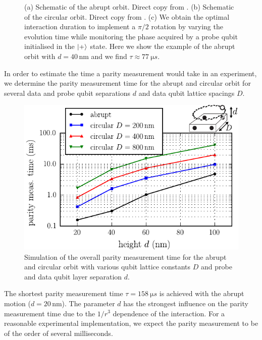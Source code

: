 \begin{figure}[H]
	\caption{(a) Schematic of the abrupt orbit. Direct copy from \cite{OGorman2016}. (b) Schematic of the circular orbit. Direct copy from \cite{OGorman2016}. (c) We obtain the optimal interaction duration to implement a $\pi/2$ rotation by varying the evolution time while monitoring the phase acquired by a probe qubit initialised in the $\ket{+}$ state. Here we show the example of the abrupt orbit with $d=40\, $nm and we find $\tau\approx \SI{77}{\micro s}$.}
	\label{FIG:abrupt_tau}
\end{figure}

In order to estimate the time a parity measurement would take in an experiment, we determine the parity measurement time for the abrupt and circular orbit for several data and probe qubit separations $d$ and data qubit lattice spacings $D$.

\begin{figure}[H]
	\includegraphics[width=\linewidth]{../Figures/tau_d_D}
	\caption{Simulation of the overall parity measurement time for the abrupt and circular orbit with various qubit lattice constants $D$ and probe and data qubit layer separation $d$.}
	\label{FIG:tau}
\end{figure}

The shortest parity measurement time $\tau=\SI{158}{\micro s}$ is achieved with the abrupt motion ($d=20\, $nm).
The parameter $d$ has the strongest influence on the parity measurement time due to the $1/r^3$ dependence of the interaction.
For a reasonable experimental implementation, we expect the parity measurement to be of the order of several milliseconds.

 
